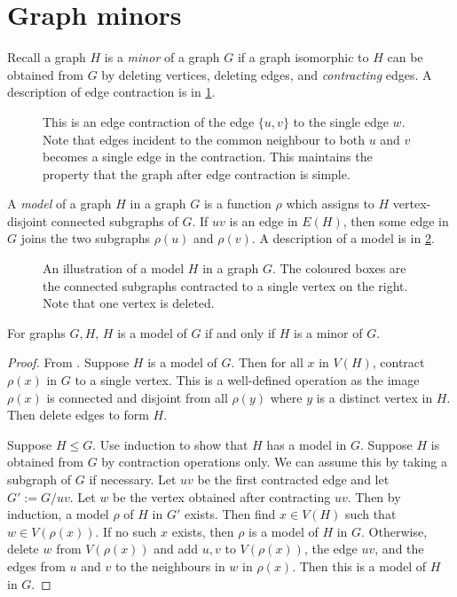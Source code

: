 \section{Graph minors}
Recall a graph \(H\) is a \textit{minor} of a graph \(G\) if a graph isomorphic to \(H\) can be obtained from \(G\) by deleting vertices, deleting edges, and \textit{contracting} edges. A description of edge contraction is in \cref{fig:edge_contraction}.
\begin{figure}[h!]
	\centering
	
	\caption[Edge contraction]{This is an edge contraction of the edge $\{u, v\}$ to the single edge $w$. Note that edges incident to the common neighbour to both $u$ and $v$ becomes a single edge in the contraction. This maintains the property that the graph after edge contraction is simple.}\label{fig:edge_contraction}
\end{figure}

A \textit{model} of a graph \(H\) in a graph \(G\) is a function $\rho$ which assigns to \(H\) vertex-disjoint connected subgraphs of \(G\). If $uv$ is an edge in \(E(H)\), then some edge in \(G\) joins the two subgraphs \(\rho(u)\) and \(\rho(v)\). A description of a model is in \cref{fig:model_of_P5}.
\begin{figure}[h!]
	\centering
	
	\caption[A model $H$ in a graph $G$.]{An illustration of a model $H$ in a graph $G$. The coloured boxes are the connected subgraphs contracted to a single vertex on the right. Note that one vertex is deleted.}\label{fig:model_of_P5}
\end{figure}

\begin{lemma}
	For graphs $G, H$, \(H\) is a model of \(G\) if and only if $H$ is a minor of $G$.
\end{lemma}

\begin{proof}
	From \textcite{norinMath599GraphMinors2017}. Suppose \(H\) is a model of \(G\). Then for all \(x\) in \(V(H)\), contract \(\rho(x)\) in \(G\) to a single vertex. This is a well-defined operation as the image $\rho(x)$ is connected and disjoint from all $\rho(y)$ where $y$ is a distinct vertex in $H$. Then delete edges to form \(H\).

	Suppose \(H \leq G\). Use induction to show that \(H\) has a model in \(G\). Suppose \(H\) is obtained from \(G\) by contraction operations only. We can assume this by taking a subgraph of \(G\) if necessary. Let \(uv\) be the first contracted edge and let \(G' := G / uv\). Let \(w\) be the vertex obtained after contracting \(uv\). Then by induction, a model \(\rho\) of \(H\) in \(G'\) exists. Then find $x \in V(H)$ such that $w \in V(\rho(x))$. If no such $x$ exists, then $\rho$ is a model of $H$ in $G$. Otherwise, delete \(w\) from \(V(\rho(x)) \) and add $u, v$ to $V(\rho(x))$, the edge $uv$, and the edges from $u$ and $v$ to the neighbours in $w$ in $\rho(x)$. Then this is a model of \(H\) in \(G\). 
\end{proof}